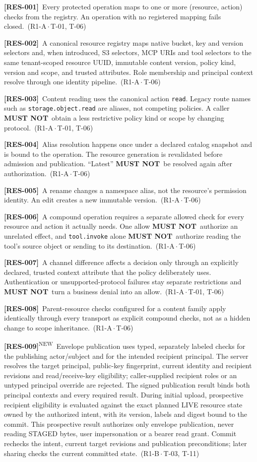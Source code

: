 \documentclass[11pt,a4paper]{article}
\newcommand{\mustnot}{\textbf{MUST NOT}}
\newcommand{\code}[1]{{\small\nolinkurl{#1}}}
\newcommand{\reqtag}[2]{{\footnotesize\color{accent}(#1\,$\cdot$\,#2)}}
\newcommand{\req}[4]{\par\noindent\hypertarget{req:#1}{\textbf{[#1]}}\ #4\ \reqtag{#2}{#3}\par}
\newcommand{\reqn}[4]{\par\noindent\hypertarget{req:#1}{\textbf{[#1]}}\textsuperscript{\color{accent}\tiny NEW}\ #4\ \reqtag{#2}{#3}\par}
\begin{document}
\req{RES-001}{R1-A}{T-01, T-06}{Every protected operation maps to one or more (resource, action) checks from the registry. An operation with no registered mapping fails closed.}
\req{RES-002}{R1-A}{T-06}{A canonical resource registry maps native bucket, key and version selectors and, when introduced, S3 selectors, MCP URIs and tool selectors to the same tenant-scoped resource UUID, immutable content version, policy kind, version and scope, and trusted attributes. Role membership and principal context resolve through one identity pipeline.}
\req{RES-003}{R1-A}{T-01, T-06}{Content reading uses the canonical action \code{read}. Legacy route names such as \code{storage.object.read} are aliases, not competing policies. A caller \mustnot\ obtain a less restrictive policy kind or scope by changing protocol.}
\req{RES-004}{R1-A}{T-06}{Alias resolution happens once under a declared catalog snapshot and is bound to the operation. The resource generation is revalidated before admission and publication. ``Latest'' \mustnot\ be resolved again after authorization.}
\req{RES-005}{R1-A}{T-06}{A rename changes a namespace alias, not the resource's permission identity. An edit creates a new immutable version.}
\req{RES-006}{R1-A}{T-06}{A compound operation requires a separate allowed check for every resource and action it actually needs. One allow \mustnot\ authorize an unrelated effect, and \code{tool.invoke} alone \mustnot\ authorize reading the tool's source object or sending to its destination.}
\req{RES-007}{R1-A}{T-01, T-06}{A channel difference affects a decision only through an explicitly declared, trusted context attribute that the policy deliberately uses. Authentication or unsupported-protocol failures stay separate restrictions and \mustnot\ turn a business denial into an allow.}
\req{RES-008}{R1-A}{T-06}{Parent-resource checks configured for a content family apply identically through every transport as explicit compound checks, not as a hidden change to scope inheritance.}

\reqn{RES-009}{R1-B}{T-03, T-11}{Envelope publication uses typed, separately labeled checks for the publishing actor/subject and for the intended recipient principal. The server resolves the target principal, public-key fingerprint, current identity and recipient revisions and read/receive-key eligibility; caller-supplied recipient roles or an untyped principal override are rejected. The signed publication result binds both principal contexts and every required result. During initial upload, prospective recipient eligibility is evaluated against the exact planned LIVE resource state owned by the authorized intent, with its version, labels and digest bound to the commit. This prospective result authorizes only envelope publication, never reading STAGED bytes, user impersonation or a bearer read grant. Commit rechecks the intent, current target revisions and publication preconditions; later sharing checks the current committed state.}
\end{document}
